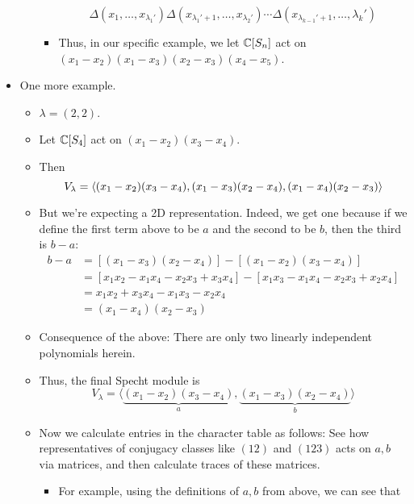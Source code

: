 \documentclass[../notes.tex]{subfiles}
\begin{document}
\begin{itemize}
\begin{itemize}
\begin{itemize}
            \begin{equation*}
                \Delta(x_1,\dots,x_{\lambda_1'})\Delta(x_{\lambda_1'+1},\dots,x_{\lambda_2'})\cdots\Delta(x_{\lambda_{k-1}'+1},\dots,\lambda_k')
            \end{equation*}
            \item Thus, in our specific example, we let $\mathbb{C}[S_n]$ act on $(x_1-x_2)(x_1-x_3)(x_2-x_3)(x_4-x_5)$.
        \end{itemize}
    \end{itemize}
    \item One more example.
    \begin{itemize}
        \item $\lambda=(2,2)$.
        \item Let $\mathbb{C}[S_4]$ act on $(x_1-x_2)(x_3-x_4)$.
        \item Then
        \begin{equation*}
            V_\lambda = \left\langle{(x_1-x_2)(x_3-x_4),(x_1-x_3)(x_2-x_4),(x_1-x_4)(x_2-x_3)}\right\rangle
        \end{equation*}
        \item But we're expecting a 2D representation. Indeed, we get one because if we define the first term above to be $a$ and the second to be $b$, then the third is $b-a$:
        \begin{align*}
            b-a &= [(x_1-x_3)(x_2-x_4)]-[(x_1-x_2)(x_3-x_4)]\\
            &= [x_1x_2-x_1x_4-x_2x_3+x_3x_4]-[x_1x_3-x_1x_4-x_2x_3+x_2x_4]\\
            &= x_1x_2+x_3x_4-x_1x_3-x_2x_4\\
            &= (x_1-x_4)(x_2-x_3)
        \end{align*}
        \item Consequence of the above: There are only two linearly independent polynomials herein.
        \item Thus, the final Specht module is
        \begin{equation*}
            V_\lambda = \langle\underbrace{(x_1-x_2)(x_3-x_4)}_a,\underbrace{(x_1-x_3)(x_2-x_4)}_b\rangle
        \end{equation*}
        \item Now we calculate entries in the character table as follows: See how representatives of conjugacy classes like $(12)$ and $(123)$ acts on $a,b$ via matrices, and then calculate traces of these matrices.
        \begin{itemize}
            \item For example, using the definitions of $a,b$ from above, we can see that

\end{itemize}
\end{itemize}
\end{itemize}
\end{document}
